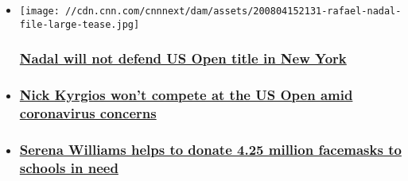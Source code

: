 \begin{itemize}
\item
  \href{/2020/08/04/tennis/rafa-nadal-us-open-spt-intl/index.html}{}

  \texttt{[image: //cdn.cnn.com/cnnnext/dam/assets/200804152131-rafael-nadal-file-large-tease.jpg]}

  \hypertarget{nadal-will-not-defend-us-open-title-in-new-york}{%
  \subsubsection{\texorpdfstring{\href{/2020/08/04/tennis/rafa-nadal-us-open-spt-intl/index.html}{Nadal
  will not defend US Open title in New
  York}}{Nadal will not defend US Open title in New York}}\label{nadal-will-not-defend-us-open-title-in-new-york}}
\item
  \hypertarget{nick-kyrgios-wont-compete-at-the-us-open-amid-coronavirus-concerns}{%
  \subsubsection{\texorpdfstring{\href{/2020/08/02/tennis/nick-kyrgios-us-open-coronavirus-spt-intl/index.html}{Nick
  Kyrgios won't compete at the US Open amid coronavirus
  concerns}}{Nick Kyrgios won't compete at the US Open amid coronavirus concerns}}\label{nick-kyrgios-wont-compete-at-the-us-open-amid-coronavirus-concerns}}
\item
  \hypertarget{serena-williams-helps-to-donate-425-million-facemasks-to-schools-in-need-}{%
  \subsubsection{\texorpdfstring{\href{/2020/07/31/tennis/serena-williams-facemasks-schools-spt-intl/index.html}{Serena
  Williams helps to donate 4.25 million facemasks to schools in need
  }}{Serena Williams helps to donate 4.25 million facemasks to schools in need }}\label{serena-williams-helps-to-donate-425-million-facemasks-to-schools-in-need-}}
\end{itemize}


